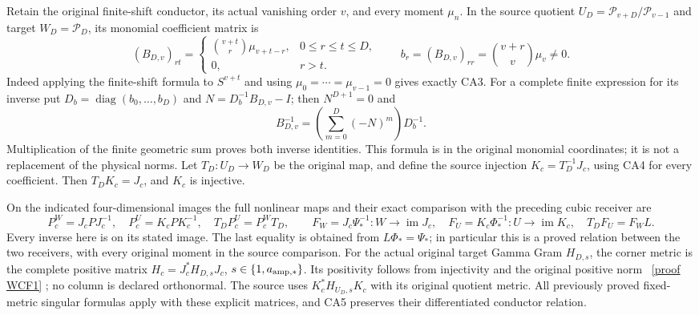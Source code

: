 \documentclass[11pt]{article}
\begin{document}
Retain the original finite-shift conductor, its actual vanishing
order $v$, and every moment $\mu_n$. In the source quotient
$U_D=\mathcal P_{v+D}/\mathcal P_{v-1}$ and target
$W_D=\mathcal P_D$, its monomial coefficient matrix is
\[
 (B_{D,v})_{rt}=\begin{cases}
 \binom{v+t}{r}\mu_{v+t-r},&0\le r\le t\le D,\\
 0,&r>t.
 \end{cases}\qquad
 b_r=(B_{D,v})_{rr}=\binom{v+r}{v}\mu_v\ne0. \tag{CA3}
\]
Indeed applying the finite-shift formula to $S^{v+t}$ and
using $\mu_0=\cdots=\mu_{v-1}=0$ gives exactly CA3.
For a complete finite expression for its inverse put
$D_b=\operatorname{diag}(b_0,\ldots,b_D)$ and
$N=D_b^{-1}B_{D,v}-I$; then $N^{D+1}=0$ and
\[
 B_{D,v}^{-1}=\left(\sum_{m=0}^D(-N)^m\right)D_b^{-1}.
 \tag{CA4}
\]
Multiplication of the finite geometric sum proves both inverse
identities. This formula is in the original monomial coordinates;
it is not a replacement of the physical norms. Let $T_D:U_D\to W_D$
be the original map, and define the source injection
$K_c=T_D^{-1}J_c$, using CA4 for every coefficient. Then
$T_DK_c=J_c$, and $K_c$ is injective.

On the indicated four-dimensional images the full nonlinear maps
and their exact comparison with the preceding cubic receiver are
\[
 P_c^W=J_cPJ_c^{-1},\quad P_c^U=K_cPK_c^{-1},\quad
 T_DP_c^U=P_c^WT_D,\qquad
 F_W=J_c\Psi_*^{-1}:W\to\operatorname{im}J_c,\quad
 F_U=K_c\Phi_*^{-1}:U\to\operatorname{im}K_c,
 \quad T_DF_U=F_WL. \tag{CA5}
\]
Every inverse here is on its stated image. The last equality is
obtained from $L\Phi_*=\Psi_*$; in particular this is a proved
relation between the two receivers, with every original moment
in the source comparison.
For the actual original target Gamma Gram $H_{D,s}$, the corner
metric is the complete positive matrix
$H_c=J_c^*H_{D,s}J_c$, $s\in\{1,a_{\rm amp,*}\}$.
Its positivity follows from injectivity and the original positive
norm \cite{WCF}%
~\href{https://github.com/KokunoYumeto/zeta-function-research-reader/blob/5992ad50c0f2a06921f1fcaded7b4e38097c0739/workbenches/splitzero-tandem/continuations/20260920-original-kernel-mixed-determinants/providers/WEIGHTED_CONDUCTOR_FORWARD.tex\#L28}{[proof WCF1]}%
{}; no column is declared orthonormal.
The source uses $K_c^*H_{U_D,s}K_c$ with its original quotient
metric. All previously proved fixed-metric singular formulas apply
with these explicit matrices, and CA5 preserves their differentiated
conductor relation.
\end{document}
